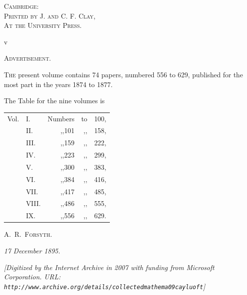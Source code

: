 \documentclass[11pt]{article}
\begin{document}
\thispagestyle{empty}
\vspace*{0.45\textheight}
\begin{center}
\textsc{Cambridge:}\\
\textsc{Printed by J. and C. F. Clay,}\\
\textsc{At the University Press.}
\end{center}
\vspace*{\fill}
\newpage

\thispagestyle{empty}
\begin{flushright}\small v\end{flushright}
\vspace*{1.5em}
\begin{center}
{\Large\scshape Advertisement.}
\end{center}
\vspace*{1em}

\noindent T\textsc{he} present volume contains 74 papers, numbered 556 to 629, published for the most part in the years 1874 to 1877.

\medskip
The Table for the nine volumes is
\begin{center}
\begin{tabular}{rlrrl}
Vol. & I.    & Numbers \quad 1   & to & 100,\\
     & II.   & ,,\quad\phantom{0}101 & ,, & 158,\\
     & III.  & ,,\quad\phantom{0}159 & ,, & 222,\\
     & IV.   & ,,\quad\phantom{0}223 & ,, & 299,\\
     & V.    & ,,\quad\phantom{0}300 & ,, & 383,\\
     & VI.   & ,,\quad\phantom{0}384 & ,, & 416,\\
     & VII.  & ,,\quad\phantom{0}417 & ,, & 485,\\
     & VIII. & ,,\quad\phantom{0}486 & ,, & 555,\\
     & IX.   & ,,\quad\phantom{0}556 & ,, & 629.
\end{tabular}
\end{center}

\vspace{2em}
\hfill A.~R.~F\textsc{orsyth}.

\medskip
\noindent\textit{17 December 1895.}
\vspace*{\fill}
\newpage

\thispagestyle{empty}
\vspace*{\fill}
\begin{center}
\textit{[Digitized by the Internet Archive in 2007 with funding from Microsoft Corporation. URL: \texttt{http://www.archive.org/details/collectedmathema09cayluoft}]}
\end{center}
\vspace*{\fill}
\newpage
\end{document}
